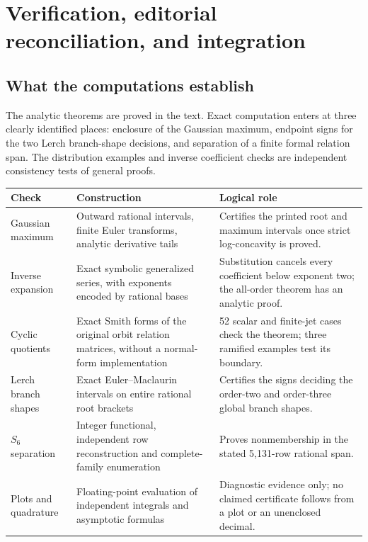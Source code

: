 \section{Verification, editorial reconciliation, and integration}
\label{sec:audit}

\subsection{What the computations establish}

The analytic theorems are proved in the text. Exact computation enters
at three clearly identified places: enclosure of the Gaussian maximum,
endpoint signs for the two Lerch branch-shape decisions, and separation
of a finite formal relation span. The distribution examples and inverse
coefficient checks are independent consistency tests of general proofs.

\begin{longtable}{@{}L{0.24\textwidth}L{0.37\textwidth}L{0.32\textwidth}@{}}
\toprule
Check & Construction & Logical role\\
\midrule
\endhead
Gaussian maximum & Outward rational intervals, finite Euler transforms,
analytic derivative tails & Certifies the printed root and maximum
intervals once strict log-concavity is proved.\\[4pt]
Inverse expansion & Exact symbolic generalized series, with exponents
encoded by rational bases & Substitution cancels every coefficient below
exponent two; the all-order theorem has an analytic proof.\\[4pt]
Cyclic quotients & Exact Smith forms of the original orbit relation
matrices, without a normal-form implementation & 52 scalar and finite-jet
cases check the theorem; three ramified examples test its boundary.\\[4pt]
Lerch branch shapes & Exact Euler--Maclaurin intervals on entire rational
root brackets & Certifies the signs deciding the order-two and
order-three global branch shapes.\\[4pt]
$S_6$ separation & Integer functional, independent row reconstruction
and complete-family enumeration & Proves nonmembership in the stated
5,131-row rational span.\\[4pt]
Plots and quadrature & Floating-point evaluation of independent
integrals and asymptotic formulas & Diagnostic evidence only; no claimed
certificate follows from a plot or an unenclosed decimal.\\
\bottomrule
\end{longtable}

